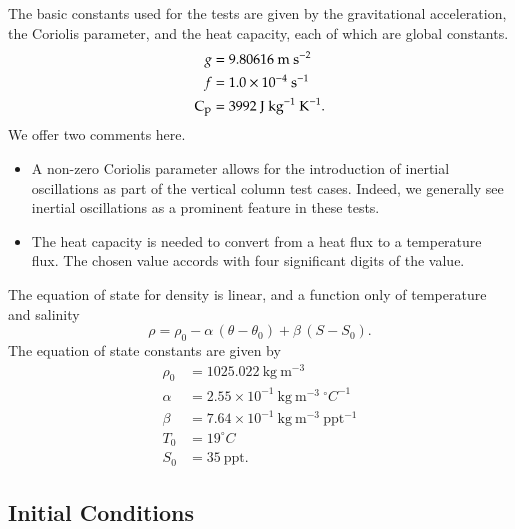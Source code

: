 The basic constants used for the tests are given by the gravitational
acceleration, the Coriolis parameter, and the heat capacity, each of
which are global constants.
\begin{subequations}
\begin{align}
 g &= 9.80616~\mbox{m}~\mbox{s}^{-2}
 \\
 f &= 1.0 \times 10^{-4}~\mbox{s}^{-1}
 \\
\mbox{C}_{\mbox{\footnotesize p}} &= 3992~\mbox{J}~\mbox{kg}^{-1}~\mbox{K}^{-1}. 
\end{align}
\end{subequations}
We offer two comments here.
\begin{itemize}
 \item A non-zero Coriolis parameter allows for the introduction of
inertial oscillations as part of the vertical column test cases.
Indeed, we generally see inertial oscillations as a prominent feature
in these tests.   
\item The heat capacity is needed to convert from a heat flux to a
  temperature flux.  The chosen value accords with four significant
  digits of the \cite{TEOS2010} value.

\end{itemize}

The equation of state for density is linear, and a function only of
temperature and salinity 
\begin{equation}
\rho = \rho_0 - \alpha \, (\theta - \theta_0) + \beta \, (S-S_0).
\label{eq:linear-eos}
\end{equation}
The equation of state constants are given by 
\begin{subequations}
\begin{align}
 \rho_0 &= 1025.022~\mbox{kg}~\mbox{m}^{-3}
\label{eq:linear-eos-paramA}
 \\
\alpha &= 2.55 \times 10^{-1}~\mbox{kg}~\mbox{m}^{-3}~^{\circ}C^{-1}
\\
\beta &= 7.64\times10^{-1}~\mbox{kg}~\mbox{m}^{-3}~\mbox{ppt}^{-1}
 \\
T_0  &=  19^{\circ}C 
\\
S_0 &=  35~\mbox{ppt}.
\label{eq:linear-eos-paramB}
\end{align}
\end{subequations}


\subsection{Initial Conditions}

